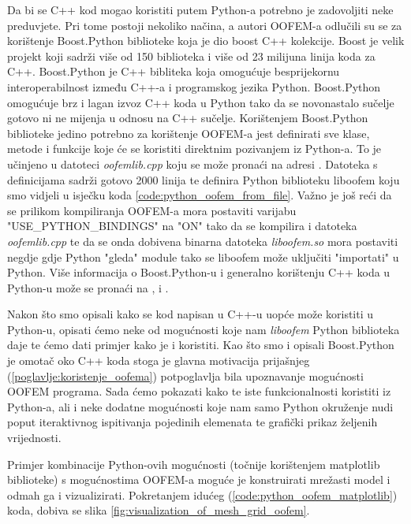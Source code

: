 \documentclass[a4paper,twoside,12pt]{memoir} %
\begin{document}
Da bi se C++ kod mogao koristiti putem Python-a potrebno je zadovoljiti neke preduvjete. Pri tome postoji nekoliko načina, a autori OOFEM-a odlučili su se za korištenje Boost.Python biblioteke koja je dio boost C++ kolekcije. Boost je velik projekt koji sadrži više od 150 biblioteka i više od 23 milijuna linija koda za C++. Boost.Python je C++ bibliteka koja omogućuje besprijekornu interoperabilnost između C++-a i programskog jezika Python. Boost.Python omogućuje brz i lagan izvoz C++ koda u Python tako da se novonastalo sučelje gotovo ni ne mijenja u odnosu na C++ sučelje. Korištenjem Boost.Python biblioteke jedino potrebno za korištenje OOFEM-a jest definirati sve klase, metode i funkcije koje će se koristiti direktnim pozivanjem iz Python-a. To je učinjeno u datoteci \textit{oofemlib.cpp} koju se može pronaći na adresi \cite{oofemlib_source}. Datoteka s definicijama sadrži gotovo 2000 linija te definira Python biblioteku liboofem koju smo vidjeli u isječku koda \ref{code:python_oofem_from_file}. Važno je još reći da se prilikom kompiliranja OOFEM-a mora postaviti varijabu "USE\_PYTHON\_BINDINGS" na "ON" tako da se kompilira i datoteka \textit{oofemlib.cpp} te da se onda dobivena binarna datoteka \textit{liboofem.so} mora postaviti negdje gdje Python "gleda" module tako se liboofem može uključiti "importati" u Python. Više informacija o Boost.Python-u i generalno korištenju C++ koda u Python-u može se pronaći na \cite{boost_python}, \cite{ctypes} i \cite{swig}. \par

Nakon što smo opisali kako se kod napisan u C++-u uopće može koristiti u Python-u, opisati ćemo neke od mogućnosti koje nam \textit{liboofem} Python biblioteka daje te ćemo dati primjer kako je i koristiti. Kao što smo i opisali Boost.Python je omotač oko C++ koda stoga je glavna motivacija prijašnjeg (\ref{poglavlje:koristenje_oofema}) potpoglavlja bila upoznavanje mogućnosti OOFEM programa. Sada ćemo pokazati kako te iste funkcionalnosti koristiti iz Python-a, ali i neke dodatne mogućnosti koje nam samo Python okruženje nudi poput iteraktivnog ispitivanja pojedinih elemenata te grafički prikaz željenih vrijednosti. \par

Primjer kombinacije Python-ovih mogućnosti (točnije korištenjem matplotlib biblioteke) s mogućnostima OOFEM-a moguće je konstruirati mrežasti model i odmah ga i vizualizirati. Pokretanjem idućeg (\ref{code:python_oofem_matplotlib}) koda, dobiva se slika \ref{fig:visualization_of_mesh_grid_oofem}.
\end{document}
